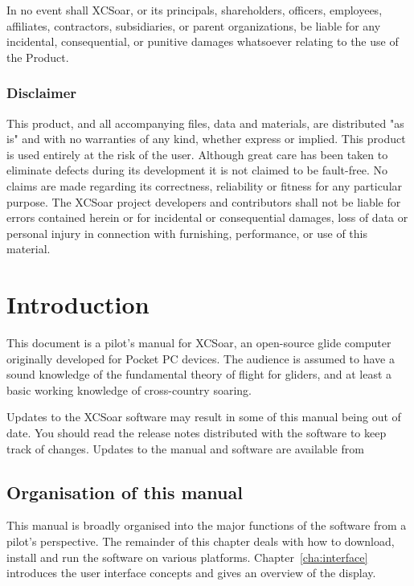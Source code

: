\documentclass[a4paper,12pt]{refrep}
\begin{document}
In no event shall XCSoar, or its principals, shareholders, officers,
employees, affiliates, contractors, subsidiaries, or parent
organizations, be liable for any incidental, consequential, or
punitive damages whatsoever relating to the use of the Product.

\subsection*{Disclaimer}

This product, and all accompanying files, data and materials, are
distributed "as is" and with no warranties of any kind, whether
express or implied.  This product is used entirely at the risk of the
user.  Although great care has been taken to eliminate defects during
its development it is not claimed to be fault-free. No claims are made
regarding its correctness, reliability or fitness for any particular
purpose.  The XCSoar project developers and contributors shall not be
liable for errors contained herein or for incidental or consequential
damages, loss of data or personal injury in connection with
furnishing, performance, or use of this material.


\chapter{Introduction}\label{cha:introduction}
This document is a pilot's manual for XCSoar, an open-source glide
computer originally developed for Pocket PC devices.  The audience 
is assumed to have a sound knowledge of the fundamental theory of flight for
gliders, and at least a basic working knowledge of cross-country soaring.

Updates to the XCSoar software may result in some of this manual being
out of date. You should read the release notes distributed with the
software to keep track of changes.  Updates to the manual and software
are available from 
\begin{quote}
\xcsoarwebsite
\end{quote}

\section{Organisation of this manual}

This manual is broadly organised into the major functions of the
software from a pilot's perspective.  The remainder of this chapter
deals with how to download, install and run the software on various
platforms.  Chapter~\ref{cha:interface} introduces the user interface
concepts and gives an overview of the display.
\end{document}
